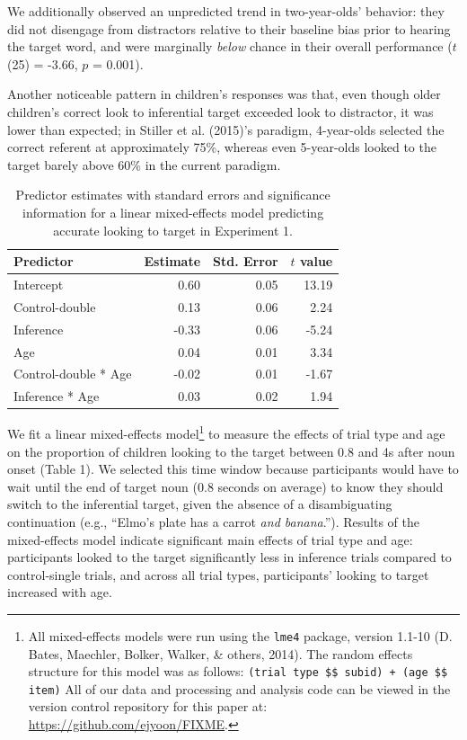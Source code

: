 \documentclass[a4paper,man,apacite,floatsintext]{apa6}
\begin{document}
We additionally observed an unpredicted trend in two-year-olds'
behavior: they did not disengage from distractors relative to their
baseline bias prior to hearing the target word, and were marginally
\emph{below} chance in their overall performance (\(t\)(25) = -3.66,
\(p\) = 0.001).

Another noticeable pattern in children's responses was that, even though
older children's correct look to inferential target exceeded look to
distractor, it was lower than expected; in Stiller et al. (2015)'s
paradigm, 4-year-olds selected the correct referent at approximately
75\%, whereas even 5-year-olds looked to the target barely above 60\% in
the current paradigm.

\begin{table}[tb]
\centering
\begin{tabular}{lrrr}
 Predictor & Estimate & Std. Error & $t$ value \\ 
  \hline
Intercept & 0.60 & 0.05 & 13.19 \\ 
  Control-double & 0.13 & 0.06 & 2.24 \\ 
  Inference & -0.33 & 0.06 & -5.24 \\ 
  Age & 0.04 & 0.01 & 3.34 \\ 
  Control-double * Age & -0.02 & 0.01 & -1.67 \\ 
  Inference * Age & 0.03 & 0.02 & 1.94 \\ 
   \hline
\end{tabular}
\caption{Predictor estimates with standard errors and significance information for a linear mixed-effects model predicting accurate looking to target in Experiment 1.} 
\label{tab:exp1_tab}
\end{table}

We fit a linear mixed-effects model\footnote{All mixed-effects models
  were run using the \texttt{lme4} package, version 1.1-10 (D. Bates,
  Maechler, Bolker, Walker, \& others, 2014). The random effects
  structure for this model was as follows:
  \texttt{(trial type \$\textbar{}\$ subid) + (age \$\textbar{}\$ item)}
  All of our data and processing and analysis code can be viewed in the
  version control repository for this paper at:
  \url{https://github.com/ejyoon/FIXME}.} to measure the effects of
trial type and age on the proportion of children looking to the target
between 0.8 and 4s after noun onset (Table 1). We selected this time
window because participants would have to wait until the end of target
noun (0.8 seconds on average) to know they should switch to the
inferential target, given the absence of a disambiguating continuation
(e.g., ``Elmo's plate has a carrot \emph{and banana}.''). Results of the
mixed-effects model indicate significant main effects of trial type and
age: participants looked to the target significantly less in inference
trials compared to control-single trials, and across all trial types,
participants' looking to target increased with age.
\end{document}
